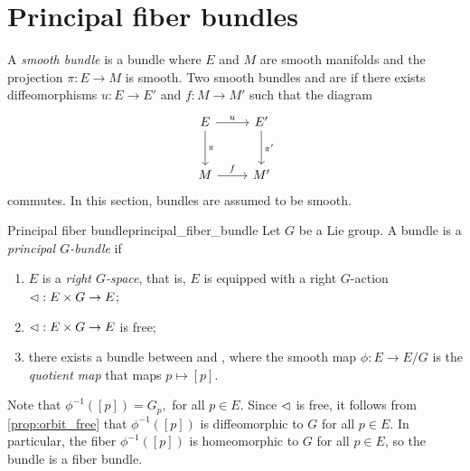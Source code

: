 \section{Principal fiber bundles}
A \emph{smooth bundle}  is a bundle where \(E\) and \(M\) are smooth manifolds and the projection \(\pi : E \to M\) is smooth. Two smooth bundles  and  are \todo[isomorphic] if there exists diffeomorphisms \(u : E \to E'\) and \(f : M \to M'\) such that the diagram
\begin{equation*}
    \begin{tikzcd}[column sep = normal, row sep = large]
        E \arrow{r}{u} \arrow{d}{\pi} & E' \arrow{d}{\pi'}\\
        M \arrow{r}{f} & M'
    \end{tikzcd}
\end{equation*}
commutes. In this section, bundles are assumed to be smooth.

\begin{definition}{Principal fiber bundle}{principal_fiber_bundle}
    Let \(G\) be a Lie group. A bundle  is a \emph{principal \(G\)-bundle} if
    \begin{enumerate}[label=(\alph*)]
        \item \(E\) is a \emph{right \(G\)-space}, that is, \(E\) is equipped with a right \(G\)-action \(\mathbin{\vartriangleleft} : E \times G \to E\);
        \item \(\mathbin{\vartriangleleft} : E \times G \to E\) is free;
        \item there exists a bundle \todo[isomorphism] between  and , where the smooth map \(\phi : E \to E/G\) is the \emph{quotient map} that maps \(p \mapsto [p]\).
    \end{enumerate}
\end{definition}
\begin{remark}
    Note that \(\phi^{-1}([p]) = G_p,\) for all \(p \in E\). Since \(\mathbin{\vartriangleleft}\) is free, it follows from \cref{prop:orbit_free} that \(\phi^{-1}([p])\) is diffeomorphic to \(G\) for all \(p \in E.\) In particular, the fiber \(\phi^{-1}([p])\) is homeomorphic to \(G\) for all \(p \in E\), so the bundle  is a fiber bundle.
\end{remark}

